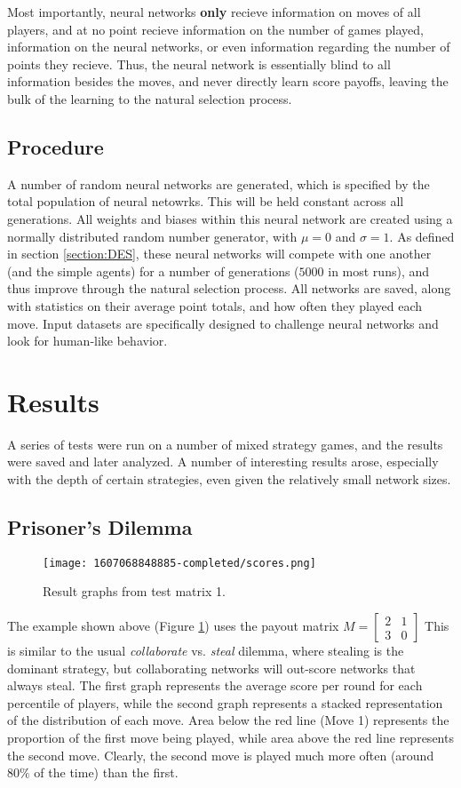 \documentclass{article}
\begin{document}
Most importantly, neural networks \textbf{only} recieve information on moves of all players, and at no point recieve information on the number of games played, information on the neural networks, or even information regarding the number of points they recieve. Thus, the neural network is essentially blind to all information besides the moves, and never directly learn score payoffs, leaving the bulk of the learning to the natural selection process.

\subsection{Procedure}
A number of random neural networks are generated, which is specified by the total population of neural netowrks. This will be held constant across all generations. All weights and biases within this neural network are created using a normally distributed random number generator, with $\mu=0$ and $\sigma=1$. As defined in section \ref{section:DES}, these neural networks will compete with one another (and the simple agents) for a number of generations ($5000$ in most runs), and thus improve through the natural selection process. All networks are saved, along with statistics on their average point totals, and how often they played each move. Input datasets are specifically designed to challenge neural networks and look for human-like behavior.

\section{Results}
A series of tests were run on a number of mixed strategy games, and the results were saved and later analyzed. A number of interesting results arose, especially with the depth of certain strategies, even given the relatively small network sizes.

\subsection{Prisoner's Dilemma}

\begin{figure}[h]
  \caption{Result graphs from test matrix 1.}
	\label{fig:1607068848885-graphs}
	\centering\texttt{[image: 1607068848885-completed/scores.png]}
\end{figure}

The example shown above (Figure \ref{fig:1607068848885-graphs}) uses the payout matrix $M=
\begin{bmatrix}
  2 & 1\\
  3 & 0
\end{bmatrix}$ This is similar to the usual \textit{collaborate} vs. \textit{steal} dilemma, where stealing is the dominant strategy, but collaborating networks will out-score networks that always steal. The first graph represents the average score per round for each percentile of players, while the second graph represents a stacked representation of the distribution of each move. Area below the red line (Move 1) represents the proportion of the first move being played, while area above the red line represents the second move. Clearly, the second move is played much more often (around $80\%$ of the time) than the first.
\end{document}
